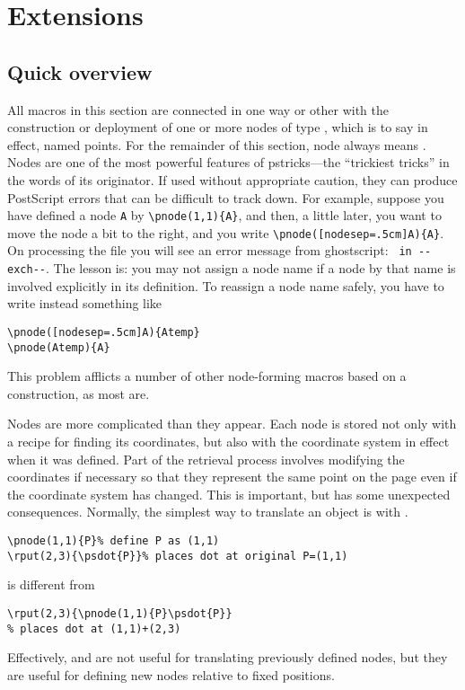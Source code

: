 \documentclass[11pt,english,BCOR10mm,DIV12,bibliography=totoc,parskip=false,smallheadings
    headexclude,footexclude,oneside]{pst-doc}
\begin{document}
\section{Extensions}
\subsection{Quick overview}
All macros in this section are connected in one way or other with the 
construction or deployment of
one or more nodes of type , which is to say in effect, 
named points. For the remainder of this section, node always means .
Nodes are one of 
the most powerful features of pstricks---the ``trickiest tricks'' in the words of 
its originator. If used without appropriate caution, they can produce PostScript errors 
that can be difficult to track down. For example, suppose you have defined a node \texttt{A} 
by \verb|\pnode(1,1){A}|, and then, a little later, you want to move the node a bit to the 
right, and you write \verb|\pnode([nodesep=.5cm]A){A}|. On processing the file you will  
see an error message from ghostscript: \verb| in --exch--|. 
The lesson is: you may not assign a node name if a node by that name is involved 
explicitly in its definition. To reassign a node name  safely, you have to write instead something like 
\begin{verbatim}
\pnode([nodesep=.5cm]A){Atemp}
\pnode(Atemp){A}
\end{verbatim}
This problem afflicts a number of other node-forming macros based on a  construction, as most are.

Nodes are more complicated than they appear. Each node is stored not only with a recipe 
for finding its coordinates, but also with the coordinate system in effect when it was 
defined. Part of the retrieval process involves modifying the coordinates if necessary 
so that they represent the same point on the page even if the coordinate system has 
changed. This is important, but has some unexpected consequences. Normally, the simplest 
way to translate an object is with .
\begin{verbatim}
\pnode(1,1){P}% define P as (1,1)
\rput(2,3){\psdot{P}}% places dot at original P=(1,1)
\end{verbatim}
is different from
\begin{verbatim}
\rput(2,3){\pnode(1,1){P}\psdot{P}}
% places dot at (1,1)+(2,3)
\end{verbatim}
Effectively,  and  are not useful for translating previously 
defined nodes, but they are useful for defining new nodes relative to fixed positions.  
\end{document}
